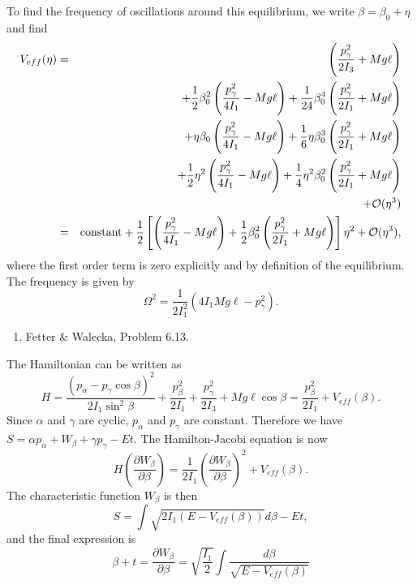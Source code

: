 \documentclass[letterpaper,11pt]{article}
\begin{document}
To find the frequency of oscillations around this equilibrium, we write $\beta = \beta_0 + \eta$ and find
\begin{eqnarray*}
 V_{eff}(\eta) & = & \left(\frac{p^2_\gamma}{2 I_3} + Mg\ell\right) \\
 & & + \frac{1}{2}\beta_0^2 \left(\frac{p^2_\gamma}{4 I_1} - Mg\ell\right) + \frac{1}{24} \beta_0^4 \left(\frac{p^2_\gamma}{2 I_1} + Mg\ell\right) \\
 & & + \eta \beta_0 \left(\frac{p^2_\gamma}{4 I_1} - Mg\ell\right) + \frac{1}{6} \eta \beta_0^3 \left(\frac{p^2_\gamma}{2 I_1} + Mg\ell\right) \\
 & & + \frac{1}{2} \eta^2 \left(\frac{p^2_\gamma}{4 I_1} - Mg\ell\right) + \frac{1}{4} \eta^2 \beta_0^2 \left(\frac{p^2_\gamma}{2 I_1} + Mg\ell\right) \\
 & & + \mathcal{O}(\eta^3) \\
 & = & \hbox{constant} + \frac{1}{2} \left[ \left(\frac{p^2_\gamma}{4 I_1} - Mg\ell\right) + \frac{1}{2} \beta_0^2 \left(\frac{p^2_\gamma}{2 I_1} + Mg\ell\right) \right] \eta^2 + \mathcal{O}(\eta^3),
\end{eqnarray*}
where the first order term is zero explicitly and by definition of the equilibrium.  The frequency is given by
\begin{equation*}
 \Omega^2 = \frac{1}{2 I_1^2} \left( 4 I_1 Mg\ell - p_\gamma^2 \right).
\end{equation*}

 
\begin{enumerate}[resume]
 \item Fetter \& Walecka, Problem 6.13.
\end{enumerate}

The Hamiltonian can be written as
\begin{equation*}
 H = \frac{(p_\alpha - p_\gamma\cos\beta)^2}{2 I_1 \sin^2\beta} + \frac{p_\beta^2}{2 I_1} + \frac{p_\gamma^2}{2 I_3} + Mg\ell\cos\beta = \frac{p_\beta^2}{2 I_1} + V_{eff}(\beta).
\end{equation*}
Since $\alpha$ and $\gamma$ are cyclic, $p_\alpha$ and $p_\gamma$ are constant.  Therefore we have $S = \alpha p_\alpha + W_\beta + \gamma p_\gamma - E t$.  The Hamilton-Jacobi equation is now
\begin{equation*}
 H\left(\frac{\partial W_\beta}{\partial \beta}\right) = \frac{1}{2 I_1} \left(\frac{\partial W_\beta}{\partial \beta}\right)^2 + V_{eff}(\beta).
\end{equation*}
The characteristic function $W_\beta$ is then
\begin{equation*}
 S = \int \sqrt{2 I_1 \left(E - V_{eff}(\beta)\right)} d\beta - E t,
\end{equation*}
and the final expression is
\begin{equation*}
 \beta + t = \frac{\partial W_\beta}{\partial \beta} = \sqrt{\frac{I_1}{2}} \int \frac{d\beta}{\sqrt{E - V_{eff}(\beta)}}
\end{equation*}
\end{document}
